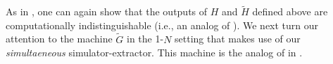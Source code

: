 

As in  , one can again show that the outputs of $H$ and $\tilde{H}$ defined above are computationally indistinguishable (i.e., an analog of ). We next turn our attention to the machine $\tilde{G}$ in the 1-$N$ setting that makes use of our {\em simultaeneous} simulator-extractor. This machine is the analog of  in  .

